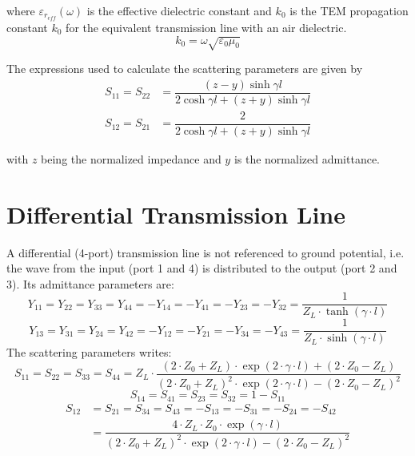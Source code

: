 where $\varepsilon_{r_{eff}}(\omega)$ is the effective dielectric
constant and $k_0$ is the TEM propagation constant $k_0$ for the
equivalent transmission line with an air dielectric.
\begin{equation}
k_0 = \omega \sqrt{\varepsilon_0 \mu_0}
\end{equation}

The expressions used to calculate the scattering parameters are given
by
\begin{align}
S_{11} = S_{22} &= \dfrac{\left(z - y\right) \sinh{\gamma l}}{2\cosh{\gamma l} + \left(z + y\right) \sinh{\gamma l}}\\
S_{12} = S_{21} &= \dfrac{2}{2\cosh{\gamma l} + \left(z + y\right) \sinh{\gamma l}}
\end{align}

with $z$ being the normalized impedance and $y$ is the normalized
admittance.


\section{Differential Transmission Line}

A differential (4-port) transmission line is not referenced to ground
potential, i.e. the wave from the input (port 1 and 4) is distributed
to the output (port 2 and 3). Its admittance parameters are:
\begin{equation}
Y_{11} = Y_{22} = Y_{33} = Y_{44} = -Y_{14} = -Y_{41} = -Y_{23} = -Y_{32} = 
  \dfrac{1}{Z_L \cdot \tanh(\gamma\cdot l)}
\end{equation}
\begin{equation}
Y_{13} = Y_{31} = Y_{24} = Y_{42} = -Y_{12} = -Y_{21} = -Y_{34} = -Y_{43} = 
  \dfrac{1}{Z_L \cdot \sinh(\gamma\cdot l)}
\end{equation}
The scattering parameters writes:
\begin{equation}
S_{11} = S_{22} = S_{33} = S_{44} =
  Z_L \cdot \dfrac{(2\cdot Z_0 + Z_L)\cdot \exp(2\cdot\gamma\cdot l) + (2\cdot Z_0 - Z_L)}
                  {(2\cdot Z_0 + Z_L)^2\cdot \exp(2\cdot\gamma\cdot l) - (2\cdot Z_0 - Z_L)^2}
\end{equation}
\begin{equation}
S_{14} = S_{41} = S_{23} = S_{32} = 1 - S_{11}
\end{equation}
\begin{align}
S_{12} &= S_{21} = S_{34} = S_{43} = -S_{13} = -S_{31} = -S_{24} = -S_{42} \\
       &= \dfrac{4\cdot Z_L \cdot Z_0 \cdot \exp(\gamma\cdot l)}
          {(2\cdot Z_0 + Z_L)^2\cdot \exp(2\cdot\gamma\cdot l) - (2\cdot Z_0 - Z_L)^2}
\end{align}

